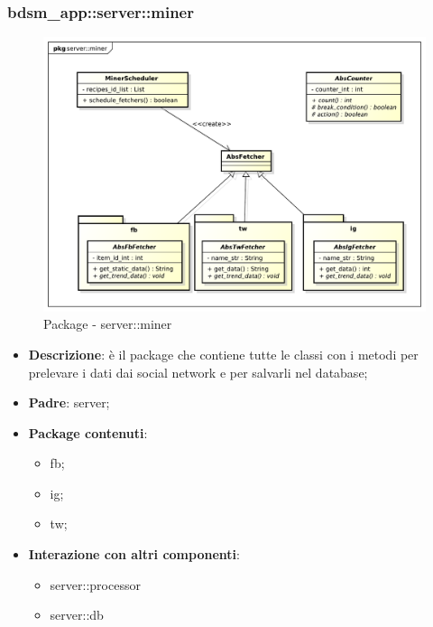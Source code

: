 


\subsubsection{bdsm\_app::server::miner} %
\label{ssub:bdsm_app_server_miner}
\begin{figure}[htbp]
	\centering
	\centerline{\includegraphics[scale=0.4]{./images/server/miner.pdf}}
	\caption{Package - server::miner}
\end{figure}

\begin{itemize}
  \item \textbf{Descrizione}: è il package che contiene tutte le classi con i metodi per prelevare i dati dai social network e per salvarli nel database;
  \item \textbf{Padre}: server;
  \item \textbf{Package contenuti}:
  	\begin{itemize}
  		\item fb;
  		\item ig;
  		\item tw;
  	\end{itemize}
  \item \textbf{Interazione con altri componenti}:
  	\begin{itemize}
  		\item server::processor
  		\item server::db
  	\end{itemize}
\end{itemize}

